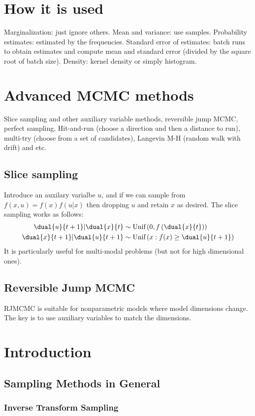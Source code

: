 \documentclass{book}
\begin{document}
\section{How it is used}
Marginalization: just ignore others. Mean and variance: use samples. Probability estimates: estimated by the frequencies. Standard error of estimates: batch runs to obtain estimates and compute mean and standard error (divided by the square root of batch size). Density: kernel density or simply histogram.

\section{Advanced MCMC methods}
Slice sampling and other auxiliary variable methods, reversible jump MCMC, perfect sampling, Hit-and-run (choose a direction and then a distance to run), multi-try (choose from a set of candidates), Langevin M-H (random walk with drift) and etc.

\subsection{Slice sampling}
Introduce an auxilary varialbe $u$, and if we can sample from $f(x,u) = f(x)f(u|x)$ then dropping $u$ and retain $x$ as desired. The slice sampling works as follows:
\begin{align}
\dual{u}{t+1} | \dual{x}{t} &\sim \text{Unif}\left(0, f\left(\dual{x}{t}\right)\right)\\
\dual{x}{t+1} | \dual{u}{t+1} &\sim \text{Unif}\left(x: f(x) \ge \dual{u}{t+1}\right)
\end{align}
It is particularly useful for multi-modal problems (but not for high dimensional ones).

\subsection{Reversible Jump MCMC}
RJMCMC is suitable for nonparametric models where model dimensions change. The key is to use auxiliary variables to match the dimensions.

\section{Introduction}
\subsection{Sampling Methods in General}
\subsubsection{Inverse Transform Sampling}
\end{document}
